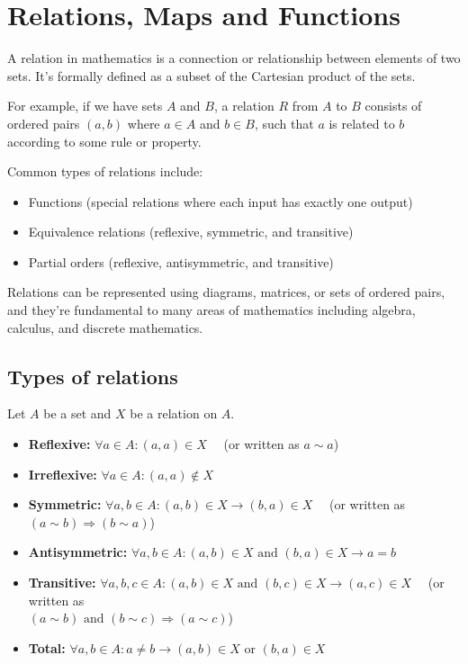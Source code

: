 \section{Relations, Maps and Functions}

A relation in mathematics is a connection or relationship between elements of two sets. It's formally
defined as a subset of the Cartesian product of the sets.

For example, if we have sets \(A\) and \(B\), a relation \(R\) from \(A\) to \(B\) consists
of ordered pairs \((a,b)\) where \(a \in A\) and \(b \in B\), such that \(a\) is related to \(b\) according to some rule or property.

Common types of relations include:
\begin{itemize}[label =\(-\)]
	\item Functions (special relations where each input has exactly one output)
	\item Equivalence relations (reflexive, symmetric, and transitive)
	\item Partial orders (reflexive, antisymmetric, and transitive)
\end{itemize}

Relations can be represented using diagrams, matrices, or sets of
ordered pairs, and they're fundamental to many areas of mathematics including algebra, calculus, and discrete mathematics.

\subsection{Types of relations}

Let \(A\) be a set and \(X\) be a relation on \(A\).

\begin{itemize}[label =\(-\)]
	\item \textbf{Reflexive:} \(\forall a \in A: (a, a) \in X\) \ \ (or written as \(a \sim a\))

	\item \textbf{Irreflexive:} \(\forall a \in A: (a, a) \not\in X\)

	\item \textbf{Symmetric:} \(\forall a, b \in A: (a, b) \in X \to (b, a) \in X\) \ \ (or written as \((a \sim b) \Rightarrow (b \sim a)\))

	\item \textbf{Antisymmetric:} \(\forall a, b \in A: (a, b) \in X \text{ and } (b, a) \in X \to a = b\)

	\item \textbf{Transitive:} \(\forall a, b, c \in A: (a, b) \in X \text{ and } (b, c) \in X \to (a, c) \in X\) \ \ (or written as \\\((a \sim b) \text{ and } (b \sim c) \Rightarrow (a \sim c)\))

	\item \textbf{Total:} \(\forall a,b \in A: a \neq b \to (a, b) \in X \text{ or } (b, a) \in X\)
\end{itemize}

